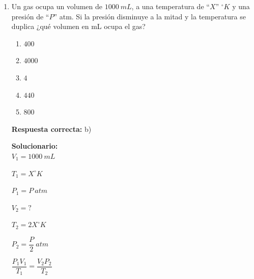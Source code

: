 \begin{enumerate}
	V. $\mathrm{HSO_4^-}$ Bisulfato
	
	\begin{enumerate}[label=\alph*)]
		\item I y IV
		\item II y V
		\item Solo III
		\item IV y II
		\item Solo V
	\end{enumerate}
	\textbf{Respuesta correcta:} b)
	
	\vspace{2mm}
	\textbf{Solucionario:}\\
	
	$(\mathrm{Cl^{+7}O_4^{2-}})^{1-}$ \quad perclorato \quad ok
	
	$(\mathrm{P^{+5}O_3^{2-}})^{1-}$ \quad fosfato \quad ok
	
	$(\mathrm{C^{+4}O_2^{2-}})$ \quad carbonato \quad no
	
	$\mathrm{Cl^{1-}}$ \qquad cloruro \quad ok
	
	$(\mathrm{H^{+1}S^{+6}O_4^{2-}})^{1-}$ \quad bisulfato \quad ok

	
	\vspace{6mm}
	
	\item Un gas ocupa un volumen de $1000\ mL$, a una temperatura de ``$X$'' $^\circ K$ y una presión de ``$P$'' atm. Si la presión disminuye a la mitad y la temperatura se duplica ¿qué volumen en mL ocupa el gas?
	\begin{enumerate}[label=\alph*)]
		\item $400$
		\item $4000$
		\item $4$
		\item $440$
		\item $800$
	\end{enumerate}
	\textbf{Respuesta correcta:} b)
	
	\vspace{2mm}
	\textbf{Solucionario:}\\
	
	$V_1=1000\ mL$
	
	$T_1=X^\circ K$
	
	$P_1=P\ atm$
	
	$V_2=?$
	
	$T_2=2X^\circ K$
	
	$P_2=\dfrac{P}{2}\ atm$
	
	$\dfrac{P_1V_1}{T_1}=\dfrac{V_2P_2}{T_2}$
	

\end{enumerate}
